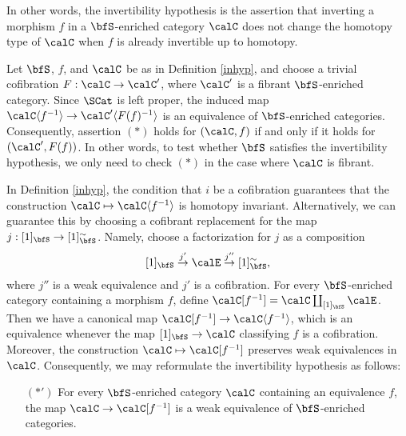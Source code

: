 In other words, the invertibility hypothesis is the assertion that inverting a morphism
$f$ in a $\bfS$-enriched category $\calC$ does not change the homotopy type of $\calC$ when $f$ is already invertible up to homotopy. 

\begin{remark}\label{attaboy}
Let $\bfS$, $f$, and $\calC$ be as in Definition \ref{inhyp}, and choose a trivial cofibration
$F: \calC \rightarrow \calC'$, where $\calC'$ is a fibrant $\bfS$-enriched category.
Since $\SCat$ is left proper, the induced map
$\calC \langle f^{-1} \rangle \rightarrow \calC' \langle F(f)^{-1} \rangle$
is an equivalence of $\bfS$-enriched categories. Consequently,
assertion $(\ast)$ holds for $(\calC, f)$ if and only if it holds for
$( \calC', F(f) )$. In other words, to test whether $\bfS$ satisfies the invertibility
hypothesis, we only need to check $(\ast)$ in the case where $\calC$ is fibrant.
\end{remark}

\begin{remark}\label{uppa}
In Definition \ref{inhyp}, the condition that $i$ be a cofibration guarantees that
the construction $\calC \mapsto \calC \langle f^{-1} \rangle$ is homotopy invariant.
Alternatively, we can guarantee this by choosing a cofibrant replacement for the
map $j: [1]_{\bfS} \rightarrow [1]^{\sim}_{\bfS}$. Namely, choose a factorization for
$j$ as a composition
$$ [1]_{\bfS} \stackrel{j'}{\rightarrow} \calE \stackrel{j''}{\rightarrow} [1]^{\sim}_{\bfS},$$
where $j''$ is a weak equivalence and $j'$ is a cofibration. For every
$\bfS$-enriched category containing a morphism $f$, define
$\calC [f^{-1} ] = \calC \coprod_{ [1]_{\bfS} } \calE$. 
Then we have a canonical map $\calC [f^{-1}] \rightarrow \calC \langle f^{-1} \rangle$,
which is an equivalence whenever the map $[1]_{\bfS} \rightarrow \calC$ classifying $f$ is a cofibration. Moreover, the construction $\calC \mapsto \calC[f^{-1}]$ preserves weak equivalences in $\calC$. Consequently, we may reformulate the invertibility hypothesis as follows:
\begin{itemize}
\item[$(\ast')$] For every $\bfS$-enriched category $\calC$ containing an equivalence
$f$, the map $\calC \rightarrow \calC[f^{-1}]$ is a weak equivalence of $\bfS$-enriched categories.
\end{itemize}
\end{remark}

